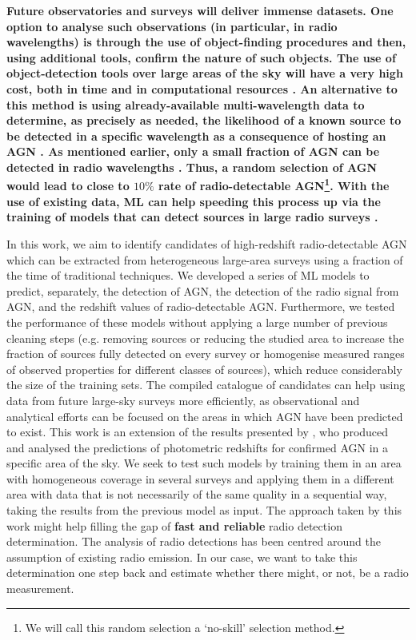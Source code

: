 \documentclass{aa}
\begin{document}
\textbf{Future observatories and surveys will deliver immense datasets. One option to analyse such observations (in particular, in radio wavelengths) is through the use of object-finding procedures \citep[e.g.][]{1996A&AS..117..393B, 2020ASPC..527..461B, 2012MNRAS.425..979H, 2015ascl.soft02007M, 2018A&C....23...92C} and then, using additional tools, confirm the nature of such objects. The use of object-detection tools over large areas of the sky will have a very high cost, both in time and in computational resources \citep{2019MNRAS.484.2793V}. An alternative to this method is using already-available multi-wavelength data to determine, as precisely as needed, the likelihood of a known source to be detected in a specific wavelength as a consequence of hosting an AGN \citep[see, for instance,][]{2022arXiv221201915P}. As mentioned earlier, only a small fraction of AGN can be detected in radio wavelengths \citep[radio-loud AGN][]{1993MNRAS.263..461P, 1994ApJ...430..533D, 2021MNRAS.506.5888M}. Thus, a random selection of AGN would lead to close to $10\%$ rate of radio-detectable AGN\footnote{We will call this random selection a `no-skill' selection method.}. With the use of existing data, ML can help speeding this process up via the training of models that can detect sources in large radio surveys \citep[see, for an example of the efforts done to achieve this goal,][]{2015PASA...32...37H, 2021MNRAS.500.3821B}.}

In this work, we aim to identify candidates of high-redshift radio-detectable AGN which can be extracted from heterogeneous large-area surveys using a fraction of the time of traditional techniques. We developed a series of ML models to predict, separately, the detection of AGN, the detection of the radio signal from AGN, and the redshift values of radio-detectable AGN. Furthermore, we tested the performance of these models without applying a large number of previous cleaning steps (e.g. removing sources or reducing the studied area to increase the fraction of sources fully detected on every survey or homogenise measured ranges of observed properties for different classes of sources), which reduce considerably the size of the training sets. The compiled catalogue of candidates can help using data from future large-sky surveys more efficiently, as observational and analytical efforts can be focused on the areas in which AGN have been predicted to exist. This work is an extension of the results presented by \citet{2021Galax...9...86C}, who produced and analysed the predictions of photometric redshifts for confirmed AGN in a specific area of the sky. We seek to test such models by training them in an area with homogeneous coverage in several surveys and applying them in a different area with data that is not necessarily of the same quality in a sequential way, taking the results from the previous model as input. The approach taken by this work might help filling the gap of \textbf{fast and reliable} radio detection determination. The analysis of radio detections has been centred around the assumption of existing radio emission. In our case, we want to take this determination one step back and estimate whether there might, or not, be a radio measurement.
\end{document}
